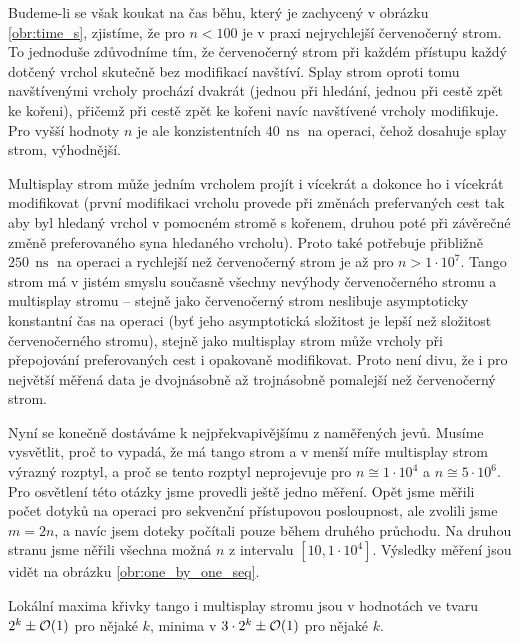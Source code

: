
Budeme-li se však koukat na čas běhu, který je zachycený v obrázku
\ref{obr:time_s}, zjistíme, že pro $n<100$ je v praxi nejrychlejší červenočerný
strom. To jednoduše zdůvodníme tím, že červenočerný strom při každém přístupu
každý dotčený vrchol skutečně bez modifikací navštíví. Splay strom oproti tomu
navštívenými vrcholy prochází dvakrát (jednou při hledání, jednou při cestě
zpět ke kořeni), přičemž při cestě zpět ke kořeni navíc navštívené vrcholy
modifikuje.  Pro vyšší hodnoty $n$ je ale konzistentních $40\,\operatorname{ns}$ na operaci, čehož dosahuje splay strom, výhodnější.


Multisplay strom může jedním vrcholem projít i vícekrát a dokonce
ho i vícekrát modifikovat (první modifikaci vrcholu provede při změnách
prefervaných cest tak aby byl hledaný vrchol v pomocném stromě s kořenem,
druhou poté při závěrečné změně preferovaného syna hledaného vrcholu). Proto
také potřebuje přibližně $250\,\operatorname{ns}$ na operaci a rychlejší než
červenočerný strom je až pro $n>1\cdot 10^7$. Tango strom má v jistém smyslu
současně všechny nevýhody červenočerného stromu a multisplay stromu -- stejně
jako červenočerný strom neslibuje asymptoticky konstantní čas na operaci (byť
jeho asymptotická složitost je lepší než složitost červenočerného stromu),
stejně jako multisplay strom může vrcholy při přepojování preferovaných cest i
opakovaně modifikovat. Proto není divu, že i pro největší měřená data je
dvojnásobně až trojnásobně pomalejší než červenočerný strom.

Nyní se konečně dostáváme k nejpřekvapivějšímu z naměřených jevů. Musíme vysvětlit, proč to vypadá, že má tango strom a v menší míře multisplay strom výrazný rozptyl, a proč se tento rozptyl neprojevuje pro $n\cong 1\cdot 10^4$ a $n\cong 5\cdot10^6$. Pro osvětlení této otázky jsme provedli ještě jedno měření. Opět jsme měřili počet dotyků na operaci pro sekvenční přístupovou posloupnost, ale zvolili jsme $m=2n$, a navíc jsem doteky počítali pouze během druhého průchodu. Na druhou stranu jsme něřili všechna možná $n$ z intervalu $[10, 1\cdot10^4]$. Výsledky měření jsou vidět na obrázku \ref{obr:one_by_one_seq}.


Lokální maxima křivky tango i multisplay stromu jsou v hodnotách ve tvaru $2^k \pm \mathcal O(1)$ pro nějaké $k$, minima v $3\cdot 2^k\pm \mathcal O(1)$ pro nějaké $k$. 

